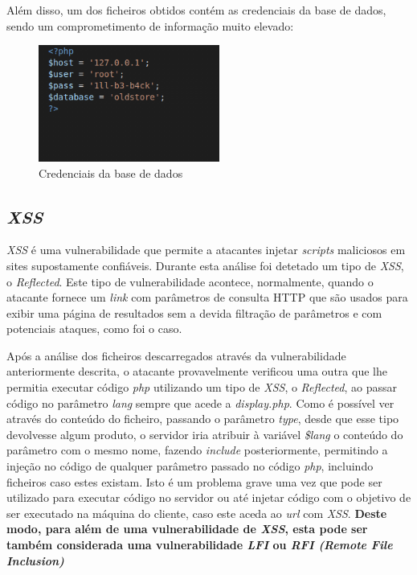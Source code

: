 \documentclass[10pt,english]{article}
\begin{document}
\clearpage

\par Além disso, um dos ficheiros obtidos contém as credenciais da base de dados, sendo um comprometimento de informação muito elevado: 

\begin{figure}[h]
    \centering
    \includegraphics[width=225]{images/configphp.png}
    \caption{Credenciais da base de dados}
\end{figure}

\clearpage


\subsection{\textit{XSS}}

\par \textit{XSS} é uma vulnerabilidade que permite a atacantes injetar \textit{scripts} maliciosos em sites supostamente confiáveis. Durante esta análise foi detetado um tipo de \textit{XSS}, o \textit{Reflected}. Este tipo de vulnerabilidade acontece, normalmente, quando o atacante fornece um \textit{link} com parâmetros de consulta HTTP que são usados para exibir uma página de resultados sem a devida filtração de parâmetros e com potenciais ataques, como foi o caso.

\par Após a análise dos ficheiros descarregados através da vulnerabilidade anteriormente descrita, o atacante provavelmente verificou uma outra que lhe permitia executar código \textit{php} utilizando um tipo de \textit{XSS}, o \textit{Reflected}, ao passar código no parâmetro \textit{lang} sempre que acede a \textit{display.php}. Como é possível ver através do conteúdo do ficheiro, passando o parâmetro \textit{type}, desde que esse tipo devolvesse algum produto, o servidor iria atribuir à variável \textit{\$lang} o conteúdo do parâmetro com o mesmo nome, fazendo \textit{include} posteriormente, permitindo a injeção no código de qualquer parâmetro passado no código \textit{php}, incluindo ficheiros caso estes existam. Isto é um problema grave uma vez que pode ser utilizado para executar código no servidor ou até injetar código com o objetivo de ser executado na máquina do cliente, caso este aceda ao \textit{url} com \textit{XSS}. \textbf{Deste modo, para além de uma vulnerabilidade de \textit{XSS}, esta pode ser também considerada uma vulnerabilidade \textit{LFI} ou \textit{RFI (Remote File Inclusion)}}
\end{document}
